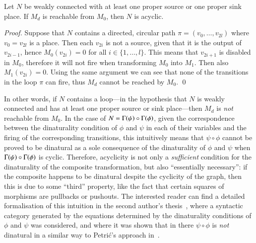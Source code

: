 \begin{theorem}\label{thm:reachability-implies-acyclicity}
    Let $N$ be weakly connected with at least one proper source or one proper sink place. If $M_d$ is reachable from $M_0$, then $N$ is acyclic.
\end{theorem}
\begin{proof}
    Suppose that $N$ contains a directed, circular path $\pi=(v_0,\dots,v_{2l})$ where $v_0 = v_{2l}$ is a place. Then each $v_{2i}$ is not a source, given that it is the output of $v_{2i-1}$, hence $M_0(v_{2i})=0$ for all $i \in \{1,\dots,l\}$. This means that $v_{2i+1}$ is disabled in $M_0$, therefore it will not fire when transforming $M_0$ into $M_1$. Then also $M_1(v_{2i})=0$. Using the same argument we can see that none of the transitions in the loop $\pi$ can fire, thus $M_d$ cannot be reached by $M_0$. \qed
\end{proof}

In other words, if $N$ contains a loop—in the hypothesis that $N$ is weakly connected and has at least one proper source or sink place—then $M_d$ is \emph{not} reachable from $M_0$. In the case of $N=\graph\psi \circ \graph\phi$, given the correspondence between the dinaturality condition of $\phi$ and $\psi$ in each of their variables and the firing of the corresponding transitions, this intuitively means that $\psi\circ\phi$ cannot be proved to be dinatural as a sole consequence of the dinaturality of $\phi$ and $\psi$ when $\graph\psi \circ \graph\phi$ is cyclic. Therefore, acyclicity is not only a \emph{sufficient} condition for the dinaturality of the composite transformation, but also ``essentially necessary'': if the composite happens to be dinatural despite the cyclicity of the graph, then this is due to some ``third'' property, like the fact that certain squares of morphisms are pullbacks or pushouts. The interested reader can find a detailed formalisation of this intuition in the second author's thesis~\cite{santamaria_towards_2019}, where a syntactic category generated by the equations determined by the dinaturality conditions of $\phi$ and $\psi$ was considered, and where it was shown that in there $\psi \circ \phi$ is \emph{not} dinatural in a similar way to Petri\'c's approach in~\cite{petric_g-dinaturality_2003}.
